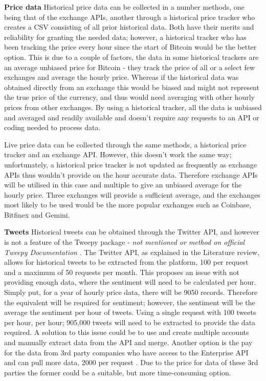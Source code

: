 \documentclass[oneside, 12pt]{article}
\begin{document}
		\textbf{Price data}
		\newline
		\newline
		Historical price data can be collected in a number methods, one being that of the exchange APIs, another through a historical price tracker who creates a CSV consisting of all prior historical data. Both have their merits and reliability for granting the needed data; however, a historical tracker who has been tracking the price every hour since the start of Bitcoin would be the better option. This is due to a couple of factors, the data in some historical trackers are an average unbiased price for Bitcoin - they track the price of all or a select few exchanges and average the hourly price. Whereas if the historical data was obtained directly from an exchange this would be biased and might not represent the true price of the currency, and thus would need averaging with other hourly prices from other exchanges. By using a historical tracker, all the data is unbiased and averaged and readily available and doesn't require any requests to an API or coding needed to process data.
		
		Live price data can be collected through the same methods, a historical price tracker and an exchange API. However, this doesn't work the same way; unfortunately, a historical price tracker is not updated as frequently as exchange APIs thus wouldn't provide on the hour accurate data. Therefore exchange APIs will be utilised in this case and multiple to give an unbiased average for the hourly price. Three exchanges will provide a sufficient average, and the exchanges most likely to be used would be the more popular exchanges such as Coinbase, Bitfinex and Gemini.
		\newline
		
		\textbf{Tweets}
		\newline
		\newline
		Historical tweets can be obtained through the Twitter API, and however is not a feature of the Tweepy package - \textit{not mentioned or method on official Tweepy Documentation} \cite{35}. The Twitter API, as explained in the Literature review, allows for historical tweets to be extracted from the platform, 100 per request and a maximum of 50 requests per month. This proposes an issue with not providing enough data, where the sentiment will need to be calculated per hour. Simply put, for a year of hourly price data, there will be 9050 records. Therefore the equivalent will be required for sentiment; however, the sentiment will be the average the sentiment per hour of tweets. Using a single request with 100 tweets per hour, per hour; 905,000 tweets will need to be extracted to provide the data required. A solution to this issue could be to use and create multiple accounts and manually extract data from the API and merge. Another option is the pay for the data from 3rd party companies who have access to the Enterprise API and can pull more data, 2000 per request \cite{7}\cite{8}. Due to the price for data of these 3rd parties the former could be a suitable, but more time-consuming option. 
		
\end{document}
